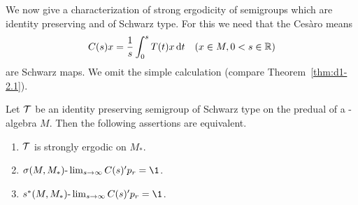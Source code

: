 We now give a characterization of strong ergodicity of semigroups which are identity preserving and of Schwarz type.
For this we need that the Cesàro means
\[
C(s)x = \frac{1}{s}\int_{0}^{s} T(t)x \mathop{}\!\mathrm{d}{t} \quad (x \in M, 0 < s \in \mathbb{R})
\]
are Schwarz maps.
We omit the simple calculation (compare Theorem~\ref{thm:d1-2.1}).
\begin{proposition}\label{prop:d4-3.3}
Let $\mathcal{T}$ be an identity preserving semigroup of Schwarz type on the predual of a \WA-algebra $M$.
Then the following assertions are equivalent.
\begin{enumerate}[\upshape (a)]
\item
$\mathcal{T}$ is strongly ergodic on $M_{*}$.

\item
$\sigma(M,M_{*})\text{-}\lim_{s \to \infty} C(s)'p_{r} = \1$.

\item
$s^{*}(M,M_{*})\text{-}\lim_{s \to \infty} C(s)'p_{r} = \1$.
\end{enumerate}
\end{proposition}

